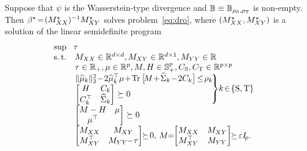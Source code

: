 \documentclass{article}
\begin{document}
\begin{theorem} \label{thm:ls-w}
Suppose that $\psi$ is the Wasserstein-type divergence and $\mathbb B \equiv \mathbb B_{\rho_{\rm S}, \rho_{\rm T}}$ is non-empty. Then $\beta^\star \!=\! (M^\star_{XX})^{-1} M_{XY}^\star$ solves problem~\eqref{eq:dro}, where $(M^\star_{XX}, M^\star_{XY})$ is a solution %
of the linear semidefinite program
\begin{equation} \notag
\!\!\!\begin{array}{cl}
     \sup &\!\tau  \\
     \st & M_{XX} \in \R^{d \times d}, M_{XY}\in \R^{d\times 1}, M_{YY} \in \R\\
     &\tau \in \R_+, \mu \in \R^p, M, H \in \PSD^{p}, C_{\rm S}, C_{\rm T} \in \R^{p \times p} \\
     &\hspace{-.2cm}\left.\begin{array}{l}
          \| \wh \mu_k\|_2^2 \!-\! 2 \msa_k^\top \m \! +\! \Tr{\! M \!+\!\wh \Sigma_k  \! -\! 2 C_k} \! \leq\! \rho_k   \\
          \begin{bmatrix}
         H &C_k \\
         C_k^\top &\wh \Sigma_k
     \end{bmatrix} \succeq 0
     \end{array}\!\!\!\!\right\}\!k \! \in \!\{\rm S, \rm T\}\\ [1.5ex]
     &\begin{bmatrix}
         M-H &\mu \\
         \mu^\top &
     \end{bmatrix} \succeq 0\\  [1.5ex]
     &\begin{bmatrix}
         M_{XX} &M_{XY} \\
         M_{XY}^\top &M_{YY}\!\!
        -\!\tau
     \end{bmatrix}\! \!\succeq \! 0,\,M\!\!=\!\!
     \begin{bmatrix}
         M_{XX} &M_{XY}\\
         M_{XY}^\top &M_{YY}\end{bmatrix} \!\!\succeq\!\eps I_{\!p}.
\end{array}
\end{equation}

\end{theorem}


\end{document}
